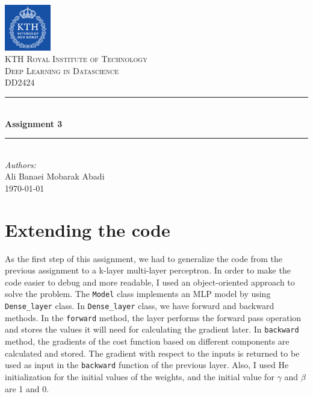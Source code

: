 \documentclass[a4paper]{article}
\begin{document}
\begin{titlepage}

\newcommand{\HRule}{\rule{\linewidth}{0.5mm}} 							%
\center 
 
 

\includegraphics[width=0.15\textwidth]{images/kth_logo.png}\\[0.5cm] 	%

\textsc{\LARGE KTH Royal Institute of Technology}\\[1cm]

\textsc{\Large Deep Learning in Datascience}\\[0.2cm]
\textsc{\large DD2424}\\[1cm] 										%
\HRule \\[0.8cm]
{ \huge \bfseries Assignment 3}\\[0.7cm]								%
\HRule \\[2cm]
\large
\emph{Authors:}\\
Ali Banaei Mobarak Abadi\\[1.5cm]													%
{\large \today}\\[5cm]

\vfill 
\end{titlepage}


\section{Extending the code}

As the first step of this assignment, we had to generalize the code from the previous assignment to a k-layer multi-layer perceptron. In order to make the code easier to debug and more readable, I used an object-oriented approach to solve the problem. The \lstinline[basicstyle=\color{red}]{Model} class implements an MLP model by using \lstinline[basicstyle=\color{red}]{Dense_layer} class. In \lstinline[basicstyle=\color{red}]{Dense_layer} class, we have forward and backward methods. In the \lstinline[basicstyle=\color{red}]{forward} method, the layer performs the forward pass operation and stores the values it will need for calculating the gradient later. In \lstinline[basicstyle=\color{red}]{backward} method, the gradients of the cost function based on different components are calculated and stored. The gradient with respect to the inputs is returned to be used as input in the \lstinline[basicstyle=\color{red}]{backward} function of the previous layer. Also, I used He initialization for the initial values of the weights, and the initial value for $\gamma$ and $\beta$ are 1 and 0.
\end{document}
